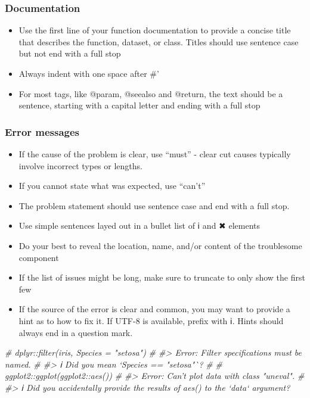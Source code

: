 \documentclass[
]{article}
\newenvironment{Shaded}{\begin{snugshade}}{\end{snugshade}}
\newcommand{\CommentTok}[1]{\textcolor[rgb]{0.56,0.35,0.01}{\textit{#1}}}
\providecommand{\tightlist}{%
  \setlength{\itemsep}{0pt}\setlength{\parskip}{0pt}}
\begin{document}
\hypertarget{documentation}{%
\subsubsection{Documentation}\label{documentation}}

\begin{itemize}
\tightlist
\item
  Use the first line of your function documentation to provide a concise
  title that describes the function, dataset, or class. Titles should
  use sentence case but not end with a full stop
\item
  Always indent with one space after \#'
\item
  For most tags, like @param, @seealso and @return, the text should be a
  sentence, starting with a capital letter and ending with a full stop
\end{itemize}

\hypertarget{error-messages}{%
\subsubsection{Error messages}\label{error-messages}}

\begin{itemize}
\tightlist
\item
  If the cause of the problem is clear, use ``must'' - clear cut causes
  typically involve incorrect types or lengths.
\item
  If you cannot state what was expected, use ``can't''
\item
  The problem statement should use sentence case and end with a full
  stop.
\item
  Use simple sentences layed out in a bullet list of ℹ and ✖ elements
\item
  Do your best to reveal the location, name, and/or content of the
  troublesome component
\item
  If the list of issues might be long, make sure to truncate to only
  show the first few
\item
  If the source of the error is clear and common, you may want to
  provide a hint as to how to fix it. If UTF-8 is available, prefix with
  ℹ. Hints should always end in a question mark.
\end{itemize}

\begin{Shaded}
\begin{Highlighting}[]
\CommentTok{# dplyr::filter(iris, Species = "setosa")}
\CommentTok{# #> Error: Filter specifications must be named.}
\CommentTok{# #> ℹ Did you mean `Species == "setosa"`?}
\CommentTok{# }
\CommentTok{# ggplot2::ggplot(ggplot2::aes())}
\CommentTok{# #> Error: Can't plot data with class "uneval". }
\CommentTok{# #> ℹ Did you accidentally provide the results of aes() to the `data` argument?}
\end{Highlighting}
\end{Shaded}
\end{document}
